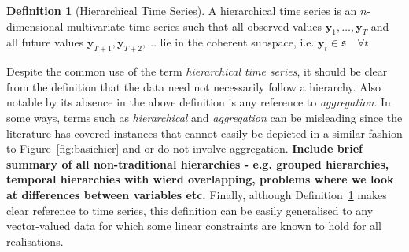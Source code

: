 \documentclass[12pt]{article}
\theoremstyle{definition}
\newtheorem{definition}{Definition}[section]
\theoremstyle{property}
\begin{document}
	 \begin{definition}[Hierarchical Time Series]\label{def:cohspace}
	 	A hierarchical time series is an $n$-dimensional multivariate time series such that all observed values $\bm{y}_1,\ldots,\bm{y}_T$ and all future values $\bm{y}_{T+1},\bm{y}_{T+2},\ldots$  lie in the coherent subspace, i.e. $\bm{y}_t\in\mathfrak{s}\quad\forall t$.
	 \end{definition}
	 
	 Despite the common use of the term {\em hierarchical time series}, it should be clear from the definition that the data need not necessarily follow a hierarchy.  Also notable by its absence in the above definition is any reference to {\em aggregation}. In some ways, terms such as {\em hierarchical} and {\em aggregation} can be misleading since the literature has covered instances that cannot easily be depicted in a similar fashion to Figure~\ref{fig:basichier} and or do not involve aggregation. {\bf Include brief summary of all non-traditional hierarchies - e.g. grouped hierarchies, temporal hierarchies with wierd overlapping, problems where we look at differences between variables etc.}  Finally, although Definition~\ref{def:cohspace} makes clear reference to time series, this definition can be easily generalised to any vector-valued data for which some linear constraints are known to hold for all realisations.
	 
	 
	 
	
%	
	
\end{document}
